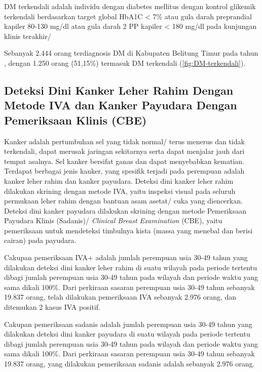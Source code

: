 DM terkendali adalah individu dengan diabetes mellitus dengan kontrol glikemik terkendali berdasarkan target global HbA1C < 7\% atau gula darah preprandial kapiler 80-130 mg/dl atau gula darah 2 PP kapiler < 180 mg/dl pada kunjungan klinis terakhir/

Sebanyak 2.444 orang terdiagnosis DM di Kabupaten Belitung Timur pada tahun \tP, dengan 1.250 orang (51,15\%) termasuk DM terkendali (\autoref{fig:DM-terkendali}).

\subsection{Deteksi Dini Kanker Leher Rahim Dengan Metode IVA dan Kanker Payudara Dengan Pemeriksaan Klinis (CBE)}
Kanker adalah pertumbuhan sel yang tidak normal/ terus menerus dan tidak terkendali, dapat merusak jaringan sekitarnya serta dapat menjalar jauh dari tempat asalnya. Sel kanker bersifat ganas dan dapat menyebabkan kematian.
Terdapat berbagai jenis kanker, yang spesifik terjadi pada perempuan adalah kanker leher rahim dan kanker payudara.
Deteksi dini kanker leher rahim dilakukan skrining dengan metode IVA, yaitu inspeksi visual pada seluruh permukaan leher rahim dengan bantuan asam asetat/ cuka yang diencerkan.
Deteksi dini kanker payudara dilakukan skrining dengan metode Pemeriksaan Payudara Klinis (Sadanis)/ \emph{Clinical Breast Examination} (CBE), yaitu pemeriksaan untuk mendeteksi timbulnya kista (massa yang menebal dan berisi cairan) pada payudara.

Cakupan pemeriksaan IVA+ adalah jumlah perempuan usia 30-49 tahun yang dilakukan deteksi dini kanker leher rahim di suatu wilayah pada periode tertentu dibagi jumlah perempuan usia 30-49 tahun pada wilayah dan periode waktu yang sama dikali 100\%.
Dari perkiraan sasaran perempuan usia 30-49 tahun sebanyak 19.837 orang, telah dilakukan pemeriksaan IVA sebanyak 2.976 orang, dan ditemukan 2 kasus IVA positif.


Cakupan pemeriksaan sadanis adalah jumlah perempuan usia 30-49 tahun yang dilakukan deteksi dini kanker payudara di suatu wilayah pada periode tertentu dibagi jumlah perempuan usia 30-49 tahun pada wilayah dan periode waktu yang sama dikali 100\%.
Dari perkiraan sasaran perempuan usia 30-49 tahun sebanyak 19.837 orang, yang dilakukan pemeriksaan sadanis adalah sebanyak 2.976 orang.

